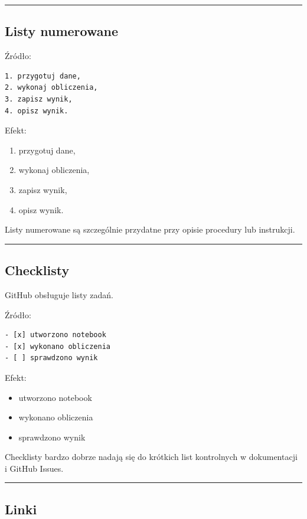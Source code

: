 \documentclass[11pt, a4paper]{article}
\begin{document}
\medskip\hrule\medskip

\subsection{Listy numerowane}

Źródło:

\begin{verbatim}
1. przygotuj dane,
2. wykonaj obliczenia,
3. zapisz wynik,
4. opisz wynik.
\end{verbatim}

Efekt:

\begin{enumerate}
    \item przygotuj dane,
    \item wykonaj obliczenia,
    \item zapisz wynik,
    \item opisz wynik.
\end{enumerate}

Listy numerowane są szczególnie przydatne przy opisie procedury lub instrukcji.

\medskip\hrule\medskip

\subsection{Checklisty}

GitHub obsługuje listy zadań.

Źródło:

\begin{verbatim}
- [x] utworzono notebook
- [x] wykonano obliczenia
- [ ] sprawdzono wynik
\end{verbatim}

Efekt:

\begin{itemize}
    \item[$\boxtimes$] utworzono notebook
    \item[$\boxtimes$] wykonano obliczenia
    \item[$\square$] sprawdzono wynik
\end{itemize}

Checklisty bardzo dobrze nadają się do krótkich list kontrolnych w dokumentacji i GitHub Issues.

\medskip\hrule\medskip

\subsection{Linki}
\end{document}
